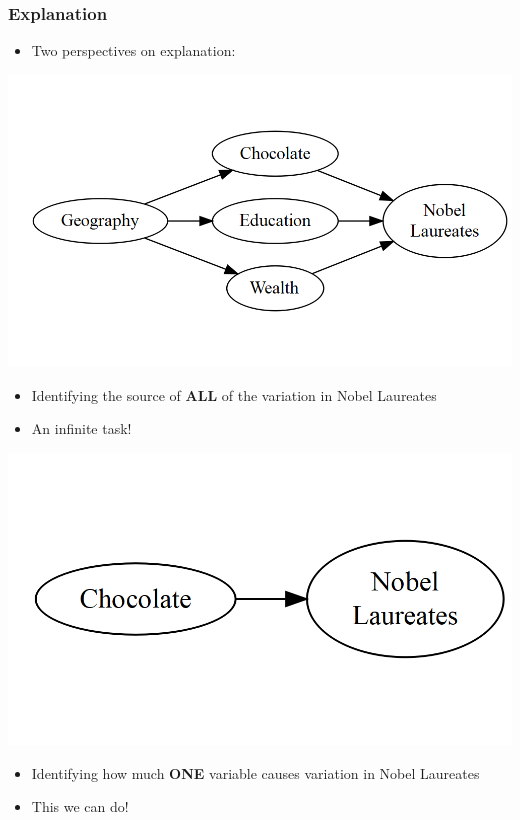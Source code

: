 \documentclass[xcolor=x11names,compress]{beamer}\usepackage[]{graphicx}\usepackage[]{color}
\makeatletter
\def\maxwidth{ %
  \ifdim\Gin@nat@width>\linewidth
    \linewidth
  \else
    \Gin@nat@width
  \fi
}
\newenvironment{knitrout}{}{} %
\renewcommand{\(}{\begin{columns}}
\renewcommand{\)}{\end{columns}}
\newcommand{\<}[1]{\begin{column}{#1}}
\renewcommand{\>}{\end{column}}
\makeatother
\begin{document}
\begin{frame}
\frametitle{Explanation}
\begin{itemize}
\item Two perspectives on explanation:
\end{itemize}
\begin{multicols}{2}
\begin{knitrout}
\color{fgcolor}
\includegraphics[width=\maxwidth]{figure/explanation1-1} 

\end{knitrout}
\pause
\begin{itemize}
\item Identifying the source of \textbf{ALL} of the variation in Nobel Laureates
\pause
\item An infinite task!
\end{itemize}
\pause
\columnbreak
\begin{knitrout}
\color{fgcolor}
\includegraphics[width=\maxwidth]{figure/explanation2-1} 

\end{knitrout}
\pause
\begin{itemize}
\item Identifying how much \textbf{ONE} variable causes variation in Nobel Laureates
\pause
\item This we can do!
\end{itemize}
\end{multicols}
\end{frame}
\end{document}
